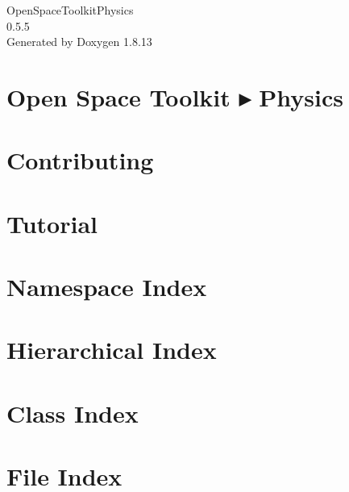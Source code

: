\documentclass[twoside]{book}
\newcommand{\+}{\discretionary{\mbox{\scriptsize$\hookleftarrow$}}{}{}}
\newcommand{\clearemptydoublepage}{%
  \newpage{\pagestyle{empty}\cleardoublepage}%
}
\begin{document}
\hypersetup{pageanchor=false,
             bookmarksnumbered=true,
             pdfencoding=unicode
            }
\begin{titlepage}
\vspace*{7cm}
\begin{center}%
{\Large Open\+Space\+Toolkit\+Physics \\[1ex]\large 0.\+5.\+5 }\\
\vspace*{1cm}
{\large Generated by Doxygen 1.8.13}\\
\end{center}
\end{titlepage}
\clearemptydoublepage
{}
\tableofcontents
\clearemptydoublepage
{}
\hypersetup{pageanchor=true}

\chapter{Open Space Toolkit ▸ Physics}
\label{index}\hypertarget{index}{}
\chapter{Contributing}
\label{md__c_o_n_t_r_i_b_u_t_i_n_g}

\chapter{Tutorial}
\label{md_docs__tutorial}

\chapter{Namespace Index}

\chapter{Hierarchical Index}

\chapter{Class Index}

\chapter{File Index}

\end{document}
